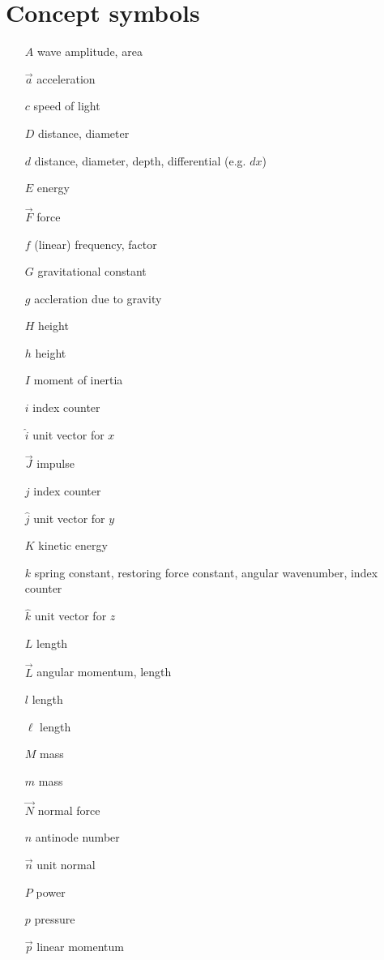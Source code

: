 

\section{Concept symbols}

\begin{itemize}
\item [$A$] wave amplitude, area 
\item [$\vec{a}$] acceleration
\item [$c$] speed of light
\item [$D$] distance, diameter 
\item [$d$] distance, diameter, depth, differential (e.g. $dx$)
\item [$E$] energy
\item [$\vec{F}$] force 
\item [$f$] (linear) frequency, factor
\item [$G$] gravitational constant
\item [$g$] accleration due to gravity
\item [$H$] height 
\item [$h$] height
\item [$I$] moment of inertia 
\item [$i$] index counter
\item [$\hat{i}$] unit vector for $x$
\item [$\vec{J}$] impulse 
\item [$j$] index counter
\item [$\hat{j}$] unit vector for $y$
\item [$K$] kinetic energy
\item [$k$] spring constant, restoring force constant, angular wavenumber, index counter
\item [$\hat{k}$] unit vector for $z$
\item [$L$] length 
\item [$\vec{L}$] angular momentum, length 
\item [$l$] length
\item [$\ell$] length
\item [$M$] mass
\item [$m$] mass
\item [$\vec{N}$] normal force
\item [$n$] antinode number
\item [$\vec{n}$] unit normal 
\item [$P$] power 
\item [$p$] pressure
\item [$\vec{p}$] linear momentum

\end{itemize}
